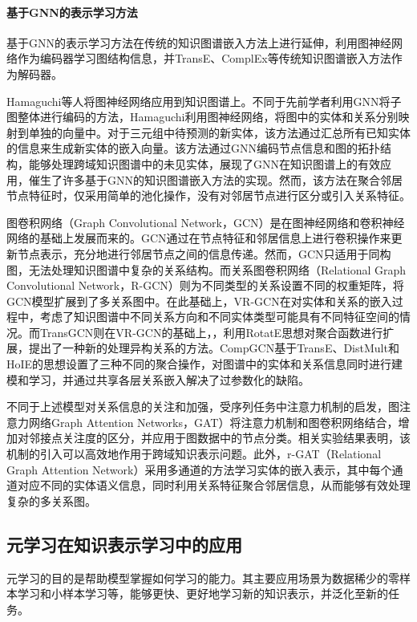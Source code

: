 \paragraph{基于GNN的表示学习方法}
基于GNN的表示学习方法在传统的知识图谱嵌入方法上进行延伸，利用图神经网络作为编码器学习图结构信息，并TransE、ComplEx等传统知识图谱嵌入方法作为解码器。

Hamaguchi\cite{hamaguchi2017knowledge}等人将图神经网络应用到知识图谱上。不同于先前学者利用GNN将子图整体进行编码的方法，Hamaguchi利用图神经网络，将图中的实体和关系分别映射到单独的向量中。对于三元组中待预测的新实体，该方法通过汇总所有已知实体的信息来生成新实体的嵌入向量。该方法通过GNN编码节点信息和图的拓扑结构，能够处理跨域知识图谱中的未见实体，展现了GNN在知识图谱上的有效应用，催生了许多基于GNN的知识图谱嵌入方法的实现。然而，该方法在聚合邻居节点特征时，仅采用简单的池化操作，没有对邻居节点进行区分或引入关系特征。

图卷积网络\cite{kipf2016semi}（Graph Convolutional Network，GCN）是在图神经网络和卷积神经网络的基础上发展而来的。GCN通过在节点特征和邻居信息上进行卷积操作来更新节点表示，充分地进行邻居节点之间的信息传递。然而，GCN只适用于同构图，无法处理知识图谱中复杂的关系结构。而关系图卷积网络\cite{schlichtkrull2018modeling}（Relational Graph Convolutional Network，R-GCN）则为不同类型的关系设置不同的权重矩阵，将GCN模型扩展到了多关系图中。在此基础上，VR-GCN\cite{ye2019vectorized}在对实体和关系的嵌入过程中，考虑了知识图谱中不同关系方向和不同实体类型可能具有不同特征空间的情况。而TransGCN\cite{cai2019transgcn}则在VR-GCN的基础上，，利用RotatE思想对聚合函数进行扩展，提出了一种新的处理异构关系的方法。CompGCN\cite{vashishth2019composition}基于TransE、DistMult和HoIE的思想设置了三种不同的聚合操作，对图谱中的实体和关系信息同时进行建模和学习，并通过共享各层关系嵌入解决了过参数化的缺陷。

不同于上述模型对关系信息的关注和加强，受序列任务中注意力机制的启发，图注意力网络\cite{nathani2019learning}Graph Attention Networks，GAT）将注意力机制和图卷积网络结合，增加对邻接点关注度的区分，并应用于图数据中的节点分类。相关实验结果表明，该机制的引入可以高效地作用于跨域知识表示问题。此外，r-GAT\cite{chen2021r}（Relational Graph Attention Network）采用多通道的方法学习实体的嵌入表示，其中每个通道对应不同的实体语义信息，同时利用关系特征聚合邻居信息，从而能够有效处理复杂的多关系图。

\subsection{元学习在知识表示学习中的应用}
元学习的目的是帮助模型掌握如何学习的能力。其主要应用场景为数据稀少的零样本学习和小样本学习等，能够更快、更好地学习新的知识表示，并泛化至新的任务。

